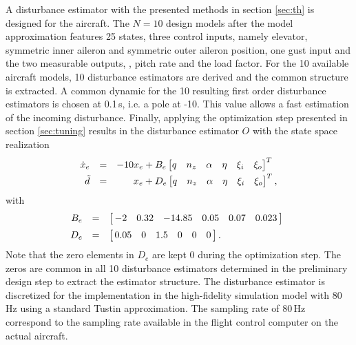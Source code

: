 \documentclass[graybox]{svmult}
\begin{document}
A disturbance estimator with the presented methods in section \ref{sec:th} is designed for the aircraft. The  $N=10$ design models after the model approximation features 25 states, three control inputs, namely elevator, symmetric inner aileron and symmetric outer aileron position, one gust input and the two measurable outputs, \ie,  pitch rate and the load factor. For the  10 available aircraft models, 10 disturbance estimators are derived and the common structure is extracted.
A common dynamic for the 10 resulting first order disturbance estimators is chosen at 0.1\,s, i.e. a pole at -10. This value allows a fast estimation of the incoming disturbance.
Finally, applying the optimization step presented in section \ref{sec:tuning}  results in the disturbance estimator $O$ with the state space realization
\begin{equation}\label{eq:obs}
	\begin{array}{rcr}
		\dot  x_e  &=& -10 x_e + B_e
		\begin{bmatrix}
			q & n_z & \alpha & \eta & \xi_i & \xi _o 
		\end{bmatrix}^T \,\,\, \vspace{+1mm} \\ 
		\tilde d &=&  x_e + 
		D_e
		\begin{bmatrix}
			q & n_z & \alpha & \eta & \xi_i & \xi _o 
		\end{bmatrix}^T,
	\end{array}
\end{equation}
with  
\begin{equation*}
\begin{array}{rcl}
B_e &=&
\begin{bmatrix}
  \, -2 &   0.32 &   -14.85 &   0.05 &   0.07 &  0.023 \,
\end{bmatrix}  \,\,\, \vspace{+2mm} \\
 D_e &=&
\begin{bmatrix}
  \, 0.05  &  0   &1.5 &0 &  0 &  0 \,
\end{bmatrix}. 
\end{array}
\end{equation*}
Note that the zero elements in $D_e$ are kept 0 during the  optimization step. The zeros are common in all 10 disturbance estimators determined in the preliminary design step to extract the estimator structure.
The disturbance estimator is discretized for the implementation in the high-fidelity simulation model with 80\,Hz using a standard Tustin approximation.
The sampling rate of 80\,Hz correspond to the sampling rate available in the flight control computer on the actual aircraft.
\end{document}
